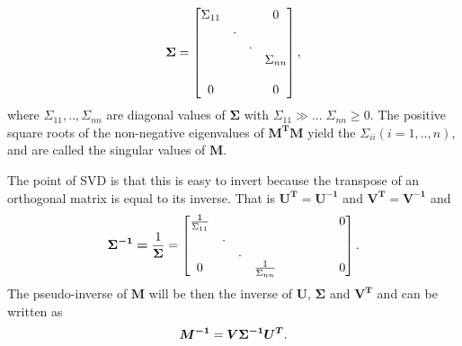 \begin{equation}
\bm{\Sigma} = \begin{bmatrix} 
\Sigma_{11} &   &   & 0           \\
            & . &   &             \\
            &   & . &             \\
            &   &   & \Sigma_{nn} \\
            &   &   &             \\
          0 &   &   & 0          \\

 \end{bmatrix}{\rm ,}
\end{equation}
where $\Sigma_{11},..,\Sigma_{nn}$ are diagonal values of $\bm{\Sigma}$ with $\Sigma_{11}\gg...\; \Sigma_{nn}\geq0$. The positive square roots of the non-negative eigenvalues of $\bm{M^T}\bm{M}$ yield the $\Sigma_{ii}(i=1,..,n)$, and are called the singular values of $\bm{M}$. 

The point of SVD is that this is easy to invert because the transpose of an orthogonal matrix is equal to its inverse. That is $\bm{U^T}=\bm{U^{-1}}$ and $\bm{V^T}=\bm{V^{-1}}$ and
\begin{equation}\label{eq:sigma_inv}
\bm{\Sigma^{-1}=}\frac{1}{\bm{\Sigma}} = \begin{bmatrix} 
\frac{1}{\Sigma_{11}} &  &  &  &  &  & & &0\\
  & . &  &  & & & & &\\
  &   & . & & & & & &\\

0 &  &  & \frac{1}{\Sigma_{nn}} &  &  & & &0 \\
 \end{bmatrix}{\rm .}
\end{equation}
The pseudo-inverse of $\bm{M}$ will be then the inverse of $\bm{U}$, $\bm{\Sigma}$ and $\bm{V^T}$ and can be written as
\begin{equation}\label{eq:psMinv}
    \bm{M^{-1}} = \bm{V \Sigma^{-1} U^T}{\rm .}
\end{equation}





